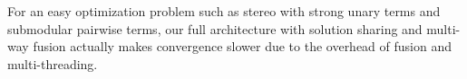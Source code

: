 For an easy optimization problem such as stereo with strong unary terms
and submodular pairwise terms, our full architecture with solution
sharing and multi-way fusion actually makes convergence slower due to the
overhead of fusion and multi-threading.









